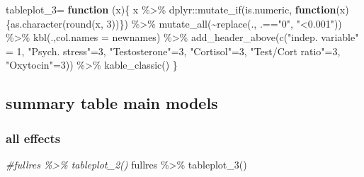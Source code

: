 \documentclass[
]{article}
\newenvironment{Shaded}{\begin{snugshade}}{\end{snugshade}}
\newcommand{\AttributeTok}[1]{\textcolor[rgb]{0.77,0.63,0.00}{#1}}
\newcommand{\CommentTok}[1]{\textcolor[rgb]{0.56,0.35,0.01}{\textit{#1}}}
\newcommand{\ControlFlowTok}[1]{\textcolor[rgb]{0.13,0.29,0.53}{\textbf{#1}}}
\newcommand{\DecValTok}[1]{\textcolor[rgb]{0.00,0.00,0.81}{#1}}
\newcommand{\FunctionTok}[1]{\textcolor[rgb]{0.00,0.00,0.00}{#1}}
\newcommand{\NormalTok}[1]{#1}
\newcommand{\OtherTok}[1]{\textcolor[rgb]{0.56,0.35,0.01}{#1}}
\newcommand{\SpecialCharTok}[1]{\textcolor[rgb]{0.00,0.00,0.00}{#1}}
\newcommand{\StringTok}[1]{\textcolor[rgb]{0.31,0.60,0.02}{#1}}
\begin{document}
\begin{Shaded}
\begin{Highlighting}[]
\NormalTok{tableplot\_3}\OtherTok{=} \ControlFlowTok{function}\NormalTok{ (x)\{}
\NormalTok{    x }\SpecialCharTok{\%\textgreater{}\%}\NormalTok{ dplyr}\SpecialCharTok{::}\FunctionTok{mutate\_if}\NormalTok{(is.numeric, }
                           \ControlFlowTok{function}\NormalTok{(x)\{}\FunctionTok{as.character}\NormalTok{(}\FunctionTok{round}\NormalTok{(x, }\DecValTok{3}\NormalTok{))\}) }\SpecialCharTok{\%\textgreater{}\%}
    \FunctionTok{mutate\_all}\NormalTok{(}\SpecialCharTok{\textasciitilde{}}\FunctionTok{replace}\NormalTok{(., .}\SpecialCharTok{==}\StringTok{"0"}\NormalTok{, }\StringTok{"\textless{}0.001"}\NormalTok{)) }\SpecialCharTok{\%\textgreater{}\%}
    \FunctionTok{kbl}\NormalTok{(.,}\AttributeTok{col.names =}\NormalTok{ newnames) }\SpecialCharTok{\%\textgreater{}\%} 
    \FunctionTok{add\_header\_above}\NormalTok{(}\FunctionTok{c}\NormalTok{(}\StringTok{"indep. variable"} \OtherTok{=} \DecValTok{1}\NormalTok{, }
                       \StringTok{"Psych. stress"}\OtherTok{=}\DecValTok{3}\NormalTok{, }
                       \StringTok{"Testosterone"}\OtherTok{=}\DecValTok{3}\NormalTok{, }
                       \StringTok{"Cortisol"}\OtherTok{=}\DecValTok{3}\NormalTok{, }
                       \StringTok{"Test/Cort ratio"}\OtherTok{=}\DecValTok{3}\NormalTok{,}
                       \StringTok{"Oxytocin"}\OtherTok{=}\DecValTok{3}\NormalTok{)) }\SpecialCharTok{\%\textgreater{}\%} \FunctionTok{kable\_classic}\NormalTok{()}
\NormalTok{\}}
\end{Highlighting}
\end{Shaded}

\hypertarget{summary-table-main-models}{%
\subsection{summary table main models}\label{summary-table-main-models}}

\hypertarget{all-effects}{%
\subsubsection{all effects}\label{all-effects}}

\begin{Shaded}
\begin{Highlighting}[]
\CommentTok{\#fullres \%\textgreater{}\% tableplot\_2() }
\NormalTok{fullres }\SpecialCharTok{\%\textgreater{}\%} \FunctionTok{tableplot\_3}\NormalTok{() }
\end{Highlighting}
\end{Shaded}
\end{document}
